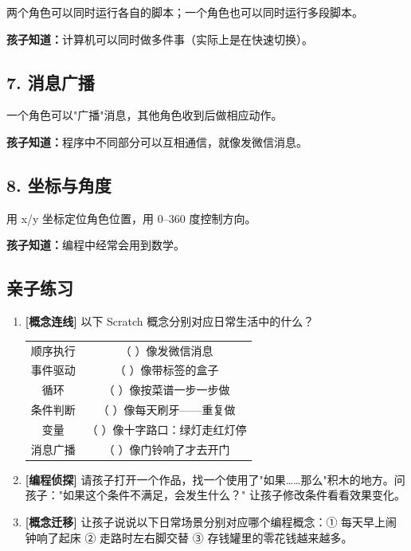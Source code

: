 \documentclass[a4paper,12pt]{ctexart}
\begin{document}
两个角色可以同时运行各自的脚本；一个角色也可以同时运行多段脚本。

\textbf{孩子知道：}计算机可以同时做多件事（实际上是在快速切换）。

\subsection*{7. 消息广播}

一个角色可以"广播"消息，其他角色收到后做相应动作。

\textbf{孩子知道：}程序中不同部分可以互相通信，就像发微信消息。

\subsection*{8. 坐标与角度}

用 x/y 坐标定位角色位置，用 0--360 度控制方向。

\textbf{孩子知道：}编程中经常会用到数学。

\subsection*{亲子练习}

\begin{enumerate}
  \item \textbf{[概念连线]} 以下 Scratch 概念分别对应日常生活中的什么？
  \begin{center}
  \begin{tabular}{c|c}
  顺序执行 & （ ）像发微信消息 \\
  事件驱动 & （ ）像带标签的盒子 \\
  循环 & （ ）像按菜谱一步一步做 \\
  条件判断 & （ ）像每天刷牙——重复做 \\
  变量 & （ ）像十字路口：绿灯走红灯停 \\
  消息广播 & （ ）像门铃响了才去开门 \\
  \end{tabular}
  \end{center}
  \item \textbf{[编程侦探]} 请孩子打开一个作品，找一个使用了"如果……那么"积木的地方。问孩子："如果这个条件不满足，会发生什么？" 让孩子修改条件看看效果变化。
  \item \textbf{[概念迁移]} 让孩子说说以下日常场景分别对应哪个编程概念：① 每天早上闹钟响了起床 ② 走路时左右脚交替 ③ 存钱罐里的零花钱越来越多。
\end{enumerate}
\end{document}
